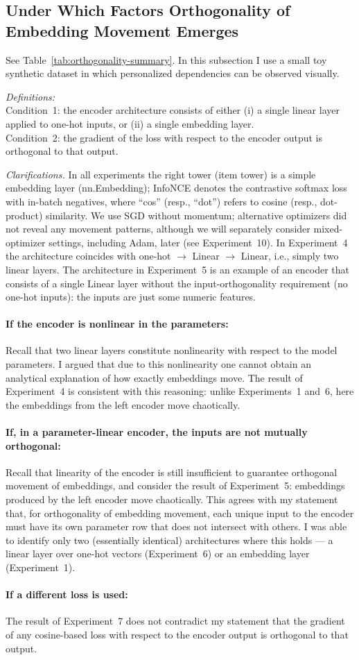 \subsection{Under Which Factors Orthogonality of Embedding Movement Emerges}

See Table~\ref{tab:orthogonality-summary}. In this subsection I use a small toy synthetic dataset in which personalized dependencies can be observed visually.

\textit{Definitions:}\\
Condition~1: the encoder architecture consists of either (i) a single linear layer applied to one-hot inputs, or (ii) a single embedding layer.\\ 
Condition~2: the gradient of the loss with respect to the encoder output is orthogonal to that output.

\textit{Clarifications.} In all experiments the right tower (item tower) is a simple embedding layer (nn.Embedding); InfoNCE denotes the contrastive softmax loss with in-batch negatives, where ``cos'' (resp., ``dot'') refers to cosine (resp., dot-product) similarity. We use SGD without momentum; alternative optimizers did not reveal any movement patterns, although we will separately consider mixed-optimizer settings, including Adam, later (see Experiment~10). In Experiment~4 the architecture coincides with one-hot $\to$ Linear $\to$ Linear, i.e., simply two linear layers. The architecture in Experiment~5 is an example of an encoder that consists of a single Linear layer without the input-orthogonality requirement (no one-hot inputs): the inputs are just some numeric features.

\paragraph{If the encoder is nonlinear in the parameters:}
Recall that two linear layers constitute nonlinearity with respect to the model parameters. I argued that due to this nonlinearity one cannot obtain an analytical explanation of how exactly embeddings move. The result of Experiment~4 is consistent with this reasoning: unlike Experiments~1 and~6, here the embeddings from the left encoder move chaotically.

\paragraph{If, in a parameter-linear encoder, the inputs are not mutually orthogonal:}
Recall that linearity of the encoder is still insufficient to guarantee orthogonal movement of embeddings, and consider the result of Experiment~5: embeddings produced by the left encoder move chaotically. This agrees with my statement that, for orthogonality of embedding movement, each unique input to the encoder must have its own parameter row that does not intersect with others. I was able to identify only two (essentially identical) architectures where this holds — a linear layer over one-hot vectors (Experiment~6) or an embedding layer (Experiment~1).

\paragraph{If a different loss is used:}
The result of Experiment~7 does not contradict my statement that the gradient of any cosine-based loss with respect to the encoder output is orthogonal to that output.
